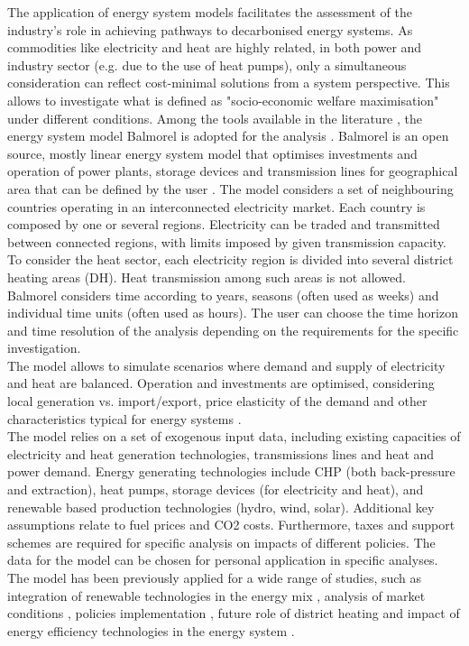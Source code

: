 \documentclass[review]{elsarticle}
\begin{document}
The application of energy system models facilitates the assessment of the industry's role in achieving pathways to decarbonised energy systems. As commodities like electricity and heat are highly related, in both power and industry sector (e.g. due to the use of heat pumps), only a simultaneous consideration can reflect cost-minimal solutions from a system perspective. This allows to investigate what is defined as "socio-economic welfare maximisation" under different conditions. 
Among the tools available in the literature \cite{Connolly2010}, the energy system model Balmorel is adopted for the analysis \cite{balmorel}.
Balmorel is an open source, mostly linear energy system model that optimises investments and operation of power plants, storage devices and transmission lines for geographical area that can be defined by the user \cite{Ravn2001,Wiese2018}. 
The model considers a set of neighbouring countries operating in an interconnected electricity market. Each country is composed by one or several regions. Electricity can be traded and transmitted between connected regions, with limits imposed by given transmission capacity. 
To consider the heat sector, each electricity region is divided into several district heating areas (DH). Heat transmission among such areas is not allowed.  
\\
Balmorel considers time according to years, seasons (often used as weeks) and individual time units (often used as hours). The user can choose the time horizon and time resolution of the analysis depending on the requirements for the specific investigation.
\\
The model allows to simulate scenarios where demand and supply of electricity and heat are balanced. Operation and investments are optimised, considering local generation vs. import/export, price elasticity of the demand and other characteristics typical for energy systems \cite{Munster2012}. 
\\
The model relies on a set of exogenous input data, including existing capacities of electricity and heat generation technologies, transmissions lines and heat and power demand. 
Energy generating technologies include CHP (both back-pressure and extraction), heat pumps, storage devices (for electricity and heat), and renewable based production technologies (hydro, wind, solar).
Additional key assumptions relate to fuel prices and CO2 costs. Furthermore, taxes and support schemes are required for specific analysis on impacts of different policies.
The data for the model can be chosen for personal application in specific analyses.
\\
The model has been previously applied for a wide range of studies, such as integration of renewable technologies in the energy mix \cite{Ball2007}, analysis of market conditions \cite{Jensen2008}, policies implementation \cite{Karlsson2008}, future role of district heating \cite{Munster2012,Munster2010} and impact of energy efficiency technologies in the energy system  \cite{Baldini2016a}.
\end{document}
